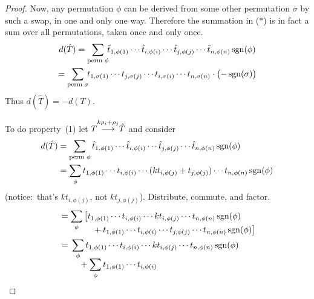 \begin{proof}
Now, any permutation $\phi$ can be derived from some 
other permutation $\sigma$ by such a swap,
in one and only one way.
Therefore the summation in ($*$) is in fact a sum over all permutations,
taken once and only once.
\begin{multline*}
  d(\hat{T})=
  \sum_{\text{perm\ }\phi}\!\!
    \hat{t}_{1,\phi(1)}
    \cdots\hat{t}_{i,\phi(i)}
    \cdots\hat{t}_{j,\phi(j)}
    \cdots \hat{t}_{n,\phi(n)}
                                 \operatorname{sgn}(\phi)   \\
  =\sum_{\text{perm\ }\sigma}\!\!
     t_{1,\sigma(1)}
    \cdots t_{j,\sigma(j)}
    \cdots t_{i,\sigma(i)}
    \cdots t_{n,\sigma(n)}
                                 \cdot\bigl(-\operatorname{sgn}(\sigma)\bigr)        
\end{multline*}
Thus \( d(\hat{T})=-d(T) \).

To do property~(1) let \( T\smash[b]{\mathrel{ \mathop{\longrightarrow}\limits^{k\rho_i+\rho_j\mathstrut}_{ \begin{subarray}{l} \relax \end{subarray}}}}\hat{T} \)
and consider
\begin{align*}
  d(\hat{T})
  &=\sum_{\text{perm\ }\phi}
    \hat{t}_{1,\phi(1)}\cdots\hat{t}_{i,\phi(i)}
    \cdots\hat{t}_{j,\phi(j)}\cdots\hat{t}_{n,\phi(n)}
                                 \operatorname{sgn}(\phi)                \\
  &=\sum_{\phi}
    t_{1,\phi(1)}\cdots t_{i,\phi(i)}
    \cdots (kt_{i,\phi(j)}+t_{j,\phi(j)})\cdots t_{n,\phi(n)}
                                 \operatorname{sgn}(\phi)
\end{align*}
(notice:~that's 
\( kt_{i,\phi(j)} \), not \( kt_{j,\phi(j)} \)).
Distribute, commute, and factor.
\begin{align*}
  &=\sum_{\phi} 
      \begin{aligned}[t]
        &\big[t_{1,\phi(1)}\cdots t_{i,\phi(i)}
          \cdots kt_{i,\phi(j)}\cdots t_{n,\phi(n)}
                                 \sgn(\phi)         \\
        &\hbox{}\quad\hbox{}
           +t_{1,\phi(1)}\cdots t_{i,\phi(i)}
           \cdots t_{j,\phi(j)}\cdots t_{n,\phi(n)}
                                 \sgn(\phi)\big]
      \end{aligned}                                               \\
  &=\begin{aligned}[t] 
         &\sum_{\smash{\phi}} t_{1,\phi(1)}\cdots t_{i,\phi(i)}
            \cdots kt_{i,\phi(j)}\cdots t_{n,\phi(n)}
                                 \sgn(\phi)           \\[-1ex]               
         &\hbox{}\quad\hbox{}
            +\sum_{\phi}
            t_{1,\phi(1)}\cdots t_{i,\phi(i)}

\end{aligned}
\end{align*}
\end{proof}
